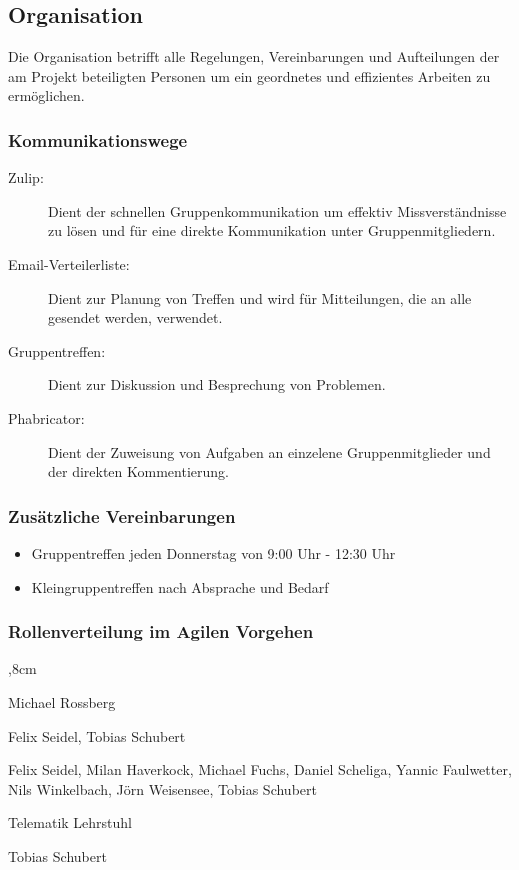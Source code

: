 \documentclass[a4paper, 11pt, ngerman, fleqn]{article}
\begin{document}
	 
\subsection{Organisation}

Die Organisation betrifft alle Regelungen, Vereinbarungen und Aufteilungen der am Projekt beteiligten Personen um ein geordnetes und effizientes Arbeiten zu ermöglichen.
	
\subsubsection{Kommunikationswege}
	\begin{description}
		\item[Zulip:] Dient der schnellen Gruppenkommunikation um effektiv Missverständnisse zu lösen und für eine direkte Kommunikation unter Gruppenmitgliedern.
		
		\item[Email-Verteilerliste:] Dient zur Planung von Treffen und wird für Mitteilungen, die an alle gesendet werden, verwendet.
		
		\item[Gruppentreffen:] Dient zur Diskussion und Besprechung von Problemen. 
		
		\item[Phabricator:] Dient der Zuweisung von Aufgaben an einzelene Gruppenmitglieder und der direkten Kommentierung.
		
	\end{description}
		
\subsubsection{Zusätzliche Vereinbarungen}
	\begin{itemize}
		\item Gruppentreffen jeden Donnerstag von 9:00 Uhr - 12:30 Uhr
		
		\item Kleingruppentreffen nach Absprache und Bedarf
		
	\end{itemize}
		
\subsubsection{Rollenverteilung im Agilen Vorgehen}

	\begin{description}
	,8cm
		\item[Produkt Owner:] Michael Rossberg
		
		\item[Scrum Master:] Felix Seidel, Tobias Schubert
		
		\item[Entwicklungsteam:] Felix Seidel, Milan Haverkock, Michael Fuchs, Daniel Scheliga, Yannic Faulwetter, Nils Winkelbach, Jörn Weisensee, Tobias Schubert
		
		\item[Kunde, Anwender:] Telematik Lehrstuhl
		
		\item[Management:] Tobias Schubert
	\end{description}
\end{document}
